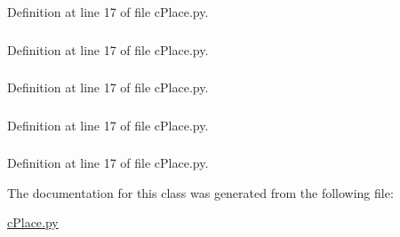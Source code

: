 \-Definition at line 17 of file c\-Place.\-py.

\hypertarget{classcPlace_1_1cPlace_aaf2f667c9f37b5a27c998f56f0bc99ba}{
\subsubsection[{lat}]{}}\label{classcPlace_1_1cPlace_aaf2f667c9f37b5a27c998f56f0bc99ba}


\-Definition at line 17 of file c\-Place.\-py.

\hypertarget{classcPlace_1_1cPlace_a7798367307ce5a9c96b344f9bf291984}{
\subsubsection[{lon}]{}}\label{classcPlace_1_1cPlace_a7798367307ce5a9c96b344f9bf291984}


\-Definition at line 17 of file c\-Place.\-py.

\hypertarget{classcPlace_1_1cPlace_af91caa448be438c836129f377892e677}{
\subsubsection[{name}]{}}\label{classcPlace_1_1cPlace_af91caa448be438c836129f377892e677}


\-Definition at line 17 of file c\-Place.\-py.

\hypertarget{classcPlace_1_1cPlace_a379418fac881c01b5d36d9596ea3f9bb}{
\subsubsection[{text}]{}}\label{classcPlace_1_1cPlace_a379418fac881c01b5d36d9596ea3f9bb}


\-Definition at line 17 of file c\-Place.\-py.



\-The documentation for this class was generated from the following file\-:\begin{DoxyCompactItemize}
\item 
\hyperlink{cPlace_8py}{c\-Place.\-py}\end{DoxyCompactItemize}
